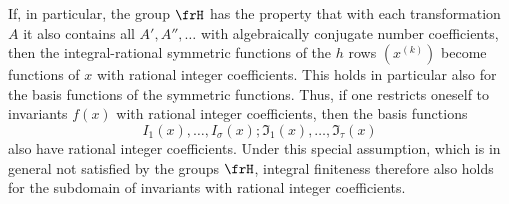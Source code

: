 \documentclass[11pt]{article}
\begin{document}
If, in particular, the group \(\frH\) has the property that with each transformation \(A\) it also contains all \(A',A'',\ldots\) with algebraically conjugate number coefficients, then the integral-rational symmetric functions of the \(h\) rows \((x^{(k)})\) become functions of \(x\) with rational integer coefficients. This holds in particular also for the basis functions of the symmetric functions. Thus, if one restricts oneself to invariants \(f(x)\) with rational integer coefficients, then the basis functions
\[
        I_1(x),\ldots,I_\sigma(x);\mathfrak I_1(x),\ldots,\mathfrak I_\tau(x)
\]
also have rational integer coefficients. Under this special assumption, which is in general not satisfied by the groups \(\frH\), integral finiteness therefore also holds for the subdomain of invariants with rational integer coefficients.
\end{document}
